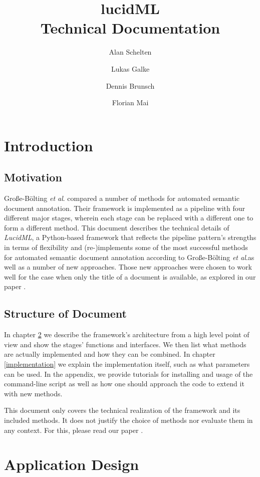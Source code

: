 \documentclass{article}
\newcommand\etal{\textit{et al}.\;}
\begin{document}
\title{lucidML \\ Technical Documentation}
\author{Alan Schelten \and Lukas Galke \and Dennis Brunsch \and Florian Mai}
\maketitle
\tableofcontents
\newpage

\section{Introduction}
\subsection{Motivation}
Gro\ss{}e-B\"olting \etal \cite{grosse2015comparison} compared a number of methods
for automated semantic document annotation. Their framework is implemented
as a pipeline with four different major stages, wherein each stage can
be replaced with a different one to form a different method. This
document describes the technical details of \emph{LucidML}, a
Python-based framework that reflects the pipeline pattern's strengths in
terms of flexibility and (re-)implements some of the most successful methods for
automated semantic document annotation according to Gro\ss{}e-B\"olting \etal as
well as a number of new approaches. Those new approaches were chosen to work
well for the case when only the title of a document is available, as explored
in our paper \cite{quadflor}.
\subsection{Structure of Document}
In chapter \ref{applicationdesign} we describe the framework's architecture from
a high level point of view and show the stages'
functions and interfaces. We then list what methods are actually
implemented and how they can be combined.
In chapter \ref{implementation} we
explain the implementation itself, such as what parameters can be used.
In the appendix, we provide tutorials for installing and usage of
the command-line script as well as how one
should approach the code to extend it with new methods.

This document only covers the technical realization of the framework and its
included methods. It does not justify the choice of methods nor
evaluate them in any context.
For this, please read our paper \cite{quadflor}.
\section{Application Design}\label{applicationdesign}
\end{document}
